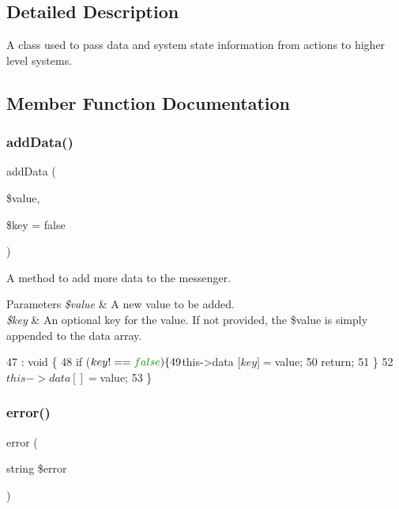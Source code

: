 \subsection{Detailed Description}
A class used to pass data and system state information from actions to higher level systems. 

\subsection{Member Function Documentation}
\mbox{\label{class_lora_1_1_messenger_ae50fa30a5d787c06060bb4b759533d5d}} 
\subsubsection{\texorpdfstring{add\+Data()}{addData()}}
{\footnotesize\ttfamily add\+Data (\begin{DoxyParamCaption}\item[{}]{\$value,  }\item[{}]{\$key = {\ttfamily false} }\end{DoxyParamCaption})}

A method to add more data to the messenger. 
\begin{DoxyParams}{Parameters}
{\em \$value} & A new value to be added. \\
\hline
{\em \$key} & An optional key for the value. If not provided, the \$value is simply appended to the data array. \\
\hline
\end{DoxyParams}

\begin{DoxyCode}
47                                                    : \textcolor{keywordtype}{void} \{
48         \textcolor{keywordflow}{if} ($key !== \textcolor{keyword}{false}) \{
49             $this->data [$key] = $value;
50             \textcolor{keywordflow}{return};
51         \}
52         $this->data [] = $value;
53     \}
\end{DoxyCode}
\mbox{\label{class_lora_1_1_messenger_a9f1c67f1ddff94d1fc4f665243996ce5}} 
\subsubsection{\texorpdfstring{error()}{error()}}
{\footnotesize\ttfamily error (\begin{DoxyParamCaption}\item[{string}]{\$error }\end{DoxyParamCaption})}

